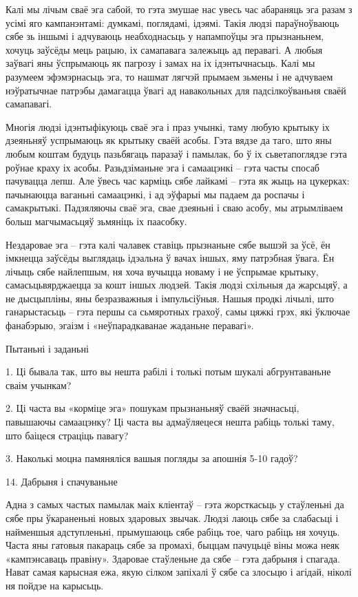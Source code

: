 Калі мы лічым сваё эга сабой, то гэта змушае нас увесь час абараняць эга разам з усімі яго кампанэнтамі: думкамі, поглядамі, ідэямі. Такія людзі параўноўваюць сябе зь іншымі і адчуваюць неабходнасьць у напампоўцы эга прызнаньнем, хочуць заўсёды мець рацыю, іх самапавага залежыць ад перавагі. А любыя заўвагі яны ўспрымаюць як пагрозу і замах на іх ідэнтычнасьць. Калі мы разумеем эфэмэрнасьць эга, то нашмат лягчэй прымаем зьмены і не адчуваем нэўратычнае патрэбы дамагацца ўвагі ад навакольных для падсілкоўваньня сваёй самапавагі.

Многія людзі ідэнтыфікуюць сваё эга і праз учынкі, таму любую крытыку іх дзеяньняў успрымаюць як крытыку сваёй асобы. Гэта вядзе да таго, што яны любым коштам будуць пазьбягаць паразаў і памылак, бо ў іх сьветапоглядзе гэта роўнае краху іх асобы. Разьдзіманьне эга і самаацэнкі – гэта часты спосаб пачувацца лепш. Але ўвесь час карміць сябе лайкамі – гэта як жыць на цукерках: пачынаюцца ваганьні самаацэнкі, і ад эўфарыі мы падаем да роспачы і самакрытыкі. Падзяляючы сваё эга, свае дзеяньні і сваю асобу, мы атрымліваем больш магчымасьцяў зьмяніць іх паасобку.

Нездаровае эга – гэта калі чалавек ставіць прызнаньне сябе вышэй за ўсё, ён імкнецца заўсёды выглядаць ідэальна ў вачах іншых, яму патрэбная ўвага. Ён лічыць сябе найлепшым, ня хоча вучыцца новаму і не ўспрымае крытыку, самасьцьвярджаецца за кошт іншых людзей. Такія людзі схільныя да жарсьцяў, а не дысцыпліны, яны безразважныя і імпульсіўныя. Нашыя продкі лічылі, што ганарыстасьць – гэта першы са сьмяротных грахоў, самы цяжкі грэх, які ўключае фанабэрыю, эгаізм і «неўпарадкаванае жаданьне перавагі».

Пытаньні і заданьні

1. Ці бывала так, што вы нешта рабілі і толькі потым шукалі абгрунтаваньне сваім учынкам?

2. Ці часта вы «корміце эга» пошукам прызнаньняў сваёй значнасьці, павышаючы самаацэнку? Ці часта вы адмаўляецеся нешта рабіць толькі таму, што баіцеся страціць павагу?

3. Наколькі моцна памяняліся вашыя погляды за апошнія 5-10 гадоў?


14. Дабрыня і спачуваньне

Адна з самых частых памылак маіх кліентаў – гэта жорсткасьць у стаўленьні да сябе пры ўкараненьні новых здаровых звычак. Людзі лаюць сябе за слабасьці і найменшыя адступленьні, прымушаюць сябе рабіць тое, чаго рабіць ня хочуць. Часта яны гатовыя пакараць сябе за промахі, быццам пачуцьцё віны можа неяк «кампэнсаваць правіну». Здаровае стаўленьне да сябе – гэта дабрыня і спагада. Нават самая карысная ежа, якую сілком запіхалі ў сябе са злосьцю і агідай, ніколі ня пойдзе на карысьць. 

